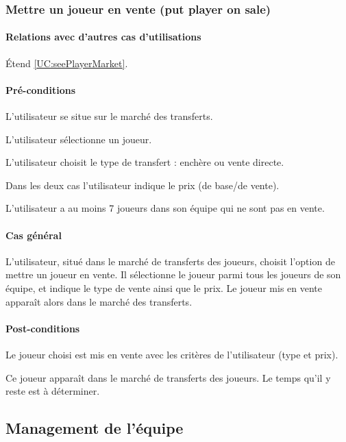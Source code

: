 \subsubsection{Mettre un joueur en vente (put player on sale)}
\label{UC:putPlayerOnSale}
\paragraph{Relations avec d'autres cas d'utilisations}
Étend \ref{UC:seePlayerMarket}.
\paragraph{Pré-conditions}
\begin{list}{}{\leftmargin=1.5em}
\item{L'utilisateur se situe sur le marché des transferts.}
\item{L'utilisateur sélectionne un joueur.}
\item{L'utilisateur choisit le type de transfert : enchère ou vente directe.}
\item{Dans les deux cas l'utilisateur indique le prix (de base/de vente).}
\item{L'utilisateur a au moins 7 joueurs dans son équipe qui ne sont pas en vente.}
\end{list}
\paragraph{Cas général}
L'utilisateur, situé dans le marché de transferts des joueurs, choisit l'option de mettre un joueur en vente. Il sélectionne le joueur parmi tous les joueurs de son équipe, et indique le type de vente ainsi que le prix. Le joueur mis en vente apparaît alors dans le marché des transferts.
\paragraph{Post-conditions}
\begin{list}{}{\leftmargin=1.5em}
\item{Le joueur choisi est mis en vente avec les critères de l'utilisateur (type et prix).}
\item{Ce joueur apparaît dans le marché de transferts des joueurs. Le temps qu'il y reste est à déterminer.}
\end{list}

\subsection{Management de l'équipe}

